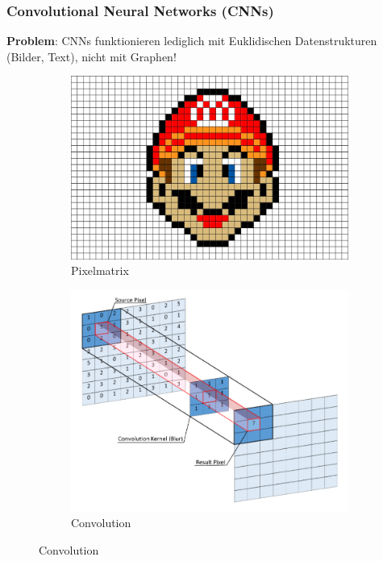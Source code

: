 \documentclass{beamer}
\begin{document}
\begin{frame}
  \frametitle{Convolutional Neural Networks (CNNs)}
  \textbf{Problem}: CNNs funktionieren lediglich mit Euklidischen Datenstrukturen (Bilder, Text), nicht mit Graphen!
  
    \begin{figure}[H]
      \centering
      \begin{subfigure}[b]{0.49\textwidth}
        \centering
        \includegraphics[width=\textwidth]{img/mario.png}
        \caption*{Pixelmatrix \cite{Mario}}
      \end{subfigure}
      \begin{subfigure}[b]{0.49\textwidth}
        \centering
        \includegraphics[width=\textwidth]{img/convolution.png}
        \caption*{Convolution \cite{Convolution}}
      \end{subfigure}
    \end{figure}
\end{frame}
\end{document}
